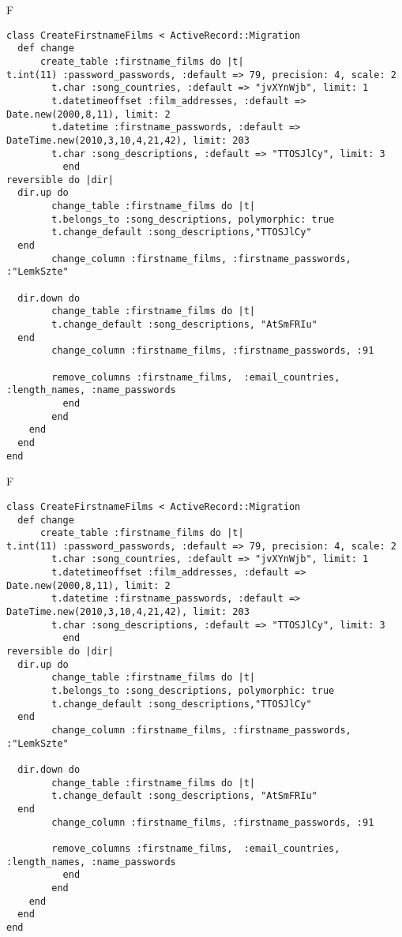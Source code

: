 F
\begin{verbatim}
class CreateFirstnameFilms < ActiveRecord::Migration
  def change
	  create_table :firstname_films do |t|
t.int(11) :password_passwords, :default => 79, precision: 4, scale: 2
		t.char :song_countries, :default => "jvXYnWjb", limit: 1
		t.datetimeoffset :film_addresses, :default => Date.new(2000,8,11), limit: 2
		t.datetime :firstname_passwords, :default => DateTime.new(2010,3,10,4,21,42), limit: 203
		t.char :song_descriptions, :default => "TTOSJlCy", limit: 3
		  end
reversible do |dir|
  dir.up do
		change_table :firstname_films do |t|
		t.belongs_to :song_descriptions, polymorphic: true
 		t.change_default :song_descriptions,"TTOSJlCy"
  end
 		change_column :firstname_films, :firstname_passwords, :"LemkSzte"
   
  dir.down do
		change_table :firstname_films do |t|
		t.change_default :song_descriptions, "AtSmFRIu"
  end
 		change_column :firstname_films, :firstname_passwords, :91
   
		remove_columns :firstname_films,  :email_countries, :length_names, :name_passwords 
	      end
	    end
    end 
  end
end

\end{verbatim}

F
\begin{verbatim}
class CreateFirstnameFilms < ActiveRecord::Migration
  def change
	  create_table :firstname_films do |t|
t.int(11) :password_passwords, :default => 79, precision: 4, scale: 2
		t.char :song_countries, :default => "jvXYnWjb", limit: 1
		t.datetimeoffset :film_addresses, :default => Date.new(2000,8,11), limit: 2
		t.datetime :firstname_passwords, :default => DateTime.new(2010,3,10,4,21,42), limit: 203
		t.char :song_descriptions, :default => "TTOSJlCy", limit: 3
		  end
reversible do |dir|
  dir.up do
		change_table :firstname_films do |t|
		t.belongs_to :song_descriptions, polymorphic: true
 		t.change_default :song_descriptions,"TTOSJlCy"
  end
 		change_column :firstname_films, :firstname_passwords, :"LemkSzte"
   
  dir.down do
		change_table :firstname_films do |t|
		t.change_default :song_descriptions, "AtSmFRIu"
  end
 		change_column :firstname_films, :firstname_passwords, :91
   
		remove_columns :firstname_films,  :email_countries, :length_names, :name_passwords 
	      end
	    end
    end 
  end
end

\end{verbatim}

